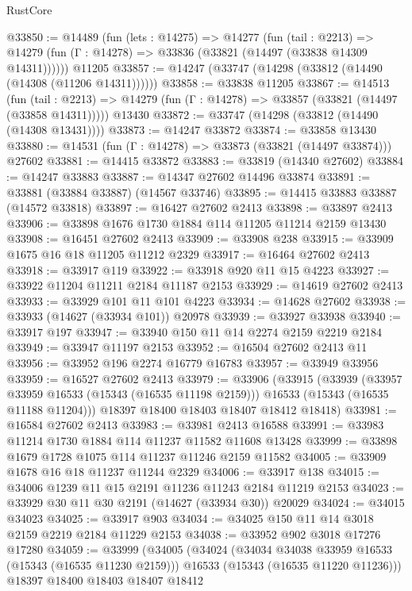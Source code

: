 \begin{lexlean}{RustCore}
\begin{coremodule}
@33850 := @14489
    (fun (lets : @14275) =>
    @14277
      (fun (tail : @2213) =>
      @14279 (fun (Γ : @14278) => @33836 (@33821 (@14497 (@33838 @14309 @14311))))))
    @11205
@33857 := @14247 (@33747 (@14298 (@33812 (@14490 (@14308 (@11206 @14311))))))
@33858 := @33838 @11205
@33867 := @14513
    (fun (tail : @2213) => @14279 (fun (Γ : @14278) => @33857 (@33821 (@14497 (@33858 @14311)))))
    @13430
@33872 := @33747 (@14298 (@33812 (@14490 (@14308 @13431))))
@33873 := @14247 @33872
@33874 := @33858 @13430
@33880 := @14531 (fun (Γ : @14278) => @33873 (@33821 (@14497 @33874))) @27602
@33881 := @14415 @33872
@33883 := @33819 (@14340 @27602)
@33884 := @14247 @33883
@33887 := @14347 @27602 @14496 @33874
@33891 := @33881 (@33884 @33887) (@14567 @33746)
@33895 := @14415 @33883 @33887 (@14572 @33818)
@33897 := @16427 @27602 @2413
@33898 := @33897 @2413
@33906 := @33898 @1676 @1730 @1884 @114 @11205 @11214 @2159 @13430
@33908 := @16451 @27602 @2413
@33909 := @33908 @238
@33915 := @33909 @1675 @16 @18 @11205 @11212 @2329
@33917 := @16464 @27602 @2413
@33918 := @33917 @119
@33922 := @33918 @920 @11 @15 @4223
@33927 := @33922 @11204 @11211 @2184 @11187 @2153
@33929 := @14619 @27602 @2413
@33933 := @33929 @101 @11 @101 @4223
@33934 := @14628 @27602
@33938 := @33933 (@14627 (@33934 @101)) @20978
@33939 := @33927 @33938
@33940 := @33917 @197
@33947 := @33940 @150 @11 @14 @2274 @2159 @2219 @2184
@33949 := @33947 @11197 @2153
@33952 := @16504 @27602 @2413 @11
@33956 := @33952 @196 @2274 @16779 @16783
@33957 := @33949 @33956
@33959 := @16527 @27602 @2413
@33979 := @33906
    (@33915
      (@33939
        (@33957 @33959 @16533 (@15343 (@16535 @11198 @2159)))
        @16533
        (@15343 (@16535 @11188 @11204)))
      @18397
      @18400
      @18403
      @18407
      @18412
      @18418)
@33981 := @16584 @27602 @2413
@33983 := @33981 @2413 @16588
@33991 := @33983 @11214 @1730 @1884 @114 @11237 @11582 @11608 @13428
@33999 := @33898 @1679 @1728 @1075 @114 @11237 @11246 @2159 @11582
@34005 := @33909 @1678 @16 @18 @11237 @11244 @2329
@34006 := @33917 @138
@34015 := @34006 @1239 @11 @15 @2191 @11236 @11243 @2184 @11219 @2153
@34023 := @33929 @30 @11 @30 @2191 (@14627 (@33934 @30)) @20029
@34024 := @34015 @34023
@34025 := @33917 @903
@34034 := @34025 @150 @11 @14 @3018 @2159 @2219 @2184 @11229 @2153
@34038 := @33952 @902 @3018 @17276 @17280
@34059 := @33999
    (@34005
      (@34024
        (@34034 @34038 @33959 @16533 (@15343 (@16535 @11230 @2159)))
        @16533
        (@15343 (@16535 @11220 @11236)))
      @18397
      @18400
      @18403
      @18407
      @18412

\end{coremodule}
\end{lexlean}
